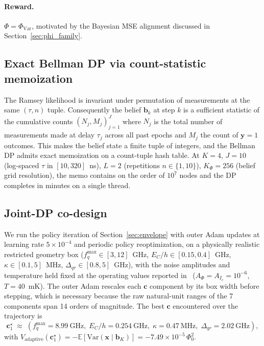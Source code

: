 \documentclass[11pt,a4paper,onecolumn]{article}
\newcommand{\E}{\mathbb{E}}
\newcommand{\bb}{\bm{b}}
\newcommand{\bx}{\bm{x}}
\newcommand{\bc}{\bm{c}}
\newcommand{\by}{\bm{y}}
\begin{document}
\paragraph{Reward.}  $\Phi = \Phi_{\text{Var}}$, motivated by the Bayesian MSE alignment discussed in Section~\ref{sec:phi_family}.

\subsection{Exact Bellman DP via count-statistic memoization}

The Ramsey likelihood is invariant under permutation of measurements at the same $(\tau, n)$ tuple.  Consequently the belief $\bb_k$ at step $k$ is a sufficient statistic of the cumulative counts $(N_j, M_j)_{j=1}^J$ where $N_j$ is the total number of measurements made at delay $\tau_j$ across all past epochs and $M_j$ the count of $\by = 1$ outcomes.  This makes the belief state a finite tuple of integers, and the Bellman DP admits exact memoization on a count-tuple hash table.  At $K = 4$, $J = 10$ (log-spaced $\tau$ in $[10, 320]$~ns), $L = 2$ (repetitions $n \in \{1, 10\}$), $K_\Phi = 256$ (belief grid resolution), the memo contains on the order of $10^7$ nodes and the DP completes in minutes on a single thread.

\subsection{Joint-DP co-design}

We run the policy iteration of Section~\ref{sec:envelope} with outer Adam updates at learning rate $5 \times 10^{-4}$ and periodic policy reoptimization, on a physically realistic restricted geometry box ($f_q^{\max} \in [3, 12]$~GHz, $E_C/h \in [0.15, 0.4]$~GHz, $\kappa \in [0.1, 5]$~MHz, $\Delta_{qr} \in [0.8, 5]$~GHz), with the noise amplitudes and temperature held fixed at the operating values reported in~\cite{danilin2024scqubit} ($A_\Phi = A_{I_c} = 10^{-6}$, $T = 40$~mK).  The outer Adam rescales each $\bc$ component by its box width before stepping, which is necessary because the raw natural-unit ranges of the 7 components span 14 orders of magnitude.  The best $\bc$ encountered over the trajectory is
\begin{equation}
\bc^\star_1 \;\approx\; (f_q^{\max} = 8.99~\mathrm{GHz},\; E_C/h = 0.254~\mathrm{GHz},\; \kappa = 0.47~\mathrm{MHz},\; \Delta_{qr} = 2.02~\mathrm{GHz}),
\end{equation}
with $V_{\text{adaptive}}(\bc^\star_1) = -\E[\mathrm{Var}(\bx \mid \bb_K)] = -7.49 \times 10^{-5}\,\Phi_0^2$.
\end{document}
